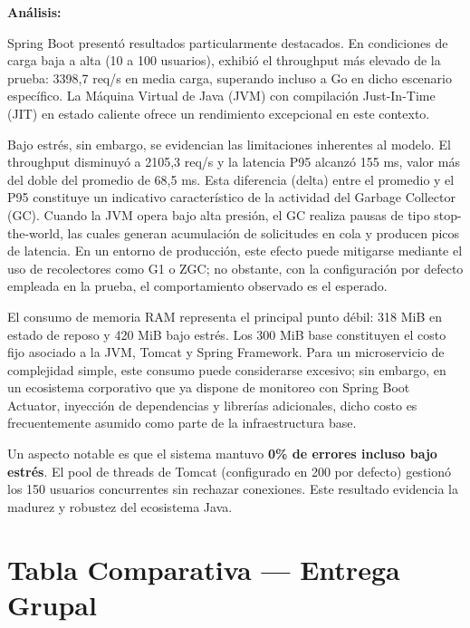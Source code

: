 \documentclass[12pt,a4paper]{article}
\begin{document}
\vspace{0.3cm}
\textbf{Análisis:}

Spring Boot presentó resultados particularmente destacados. En condiciones de carga baja a alta (10 a 100 usuarios), exhibió el throughput más elevado de la prueba: 3398,7 req/s en media carga, superando incluso a Go en dicho escenario específico. La Máquina Virtual de Java (JVM) con compilación Just-In-Time (JIT) en estado caliente ofrece un rendimiento excepcional en este contexto.

Bajo estrés, sin embargo, se evidencian las limitaciones inherentes al modelo. El throughput disminuyó a 2105,3 req/s y la latencia P95 alcanzó 155 ms, valor más del doble del promedio de 68,5 ms. Esta diferencia (delta) entre el promedio y el P95 constituye un indicativo característico de la actividad del Garbage Collector (GC). Cuando la JVM opera bajo alta presión, el GC realiza pausas de tipo stop-the-world, las cuales generan acumulación de solicitudes en cola y producen picos de latencia. En un entorno de producción, este efecto puede mitigarse mediante el uso de recolectores como G1 o ZGC; no obstante, con la configuración por defecto empleada en la prueba, el comportamiento observado es el esperado.

El consumo de memoria RAM representa el principal punto débil: 318 MiB en estado de reposo y 420 MiB bajo estrés. Los 300 MiB base constituyen el costo fijo asociado a la JVM, Tomcat y Spring Framework. Para un microservicio de complejidad simple, este consumo puede considerarse excesivo; sin embargo, en un ecosistema corporativo que ya dispone de monitoreo con Spring Boot Actuator, inyección de dependencias y librerías adicionales, dicho costo es frecuentemente asumido como parte de la infraestructura base.

Un aspecto notable es que el sistema mantuvo \textbf{0\% de errores incluso bajo estrés}. El pool de threads de Tomcat (configurado en 200 por defecto) gestionó los 150 usuarios concurrentes sin rechazar conexiones. Este resultado evidencia la madurez y robustez del ecosistema Java.

\newpage

\section{Tabla Comparativa --- Entrega Grupal}
\end{document}
